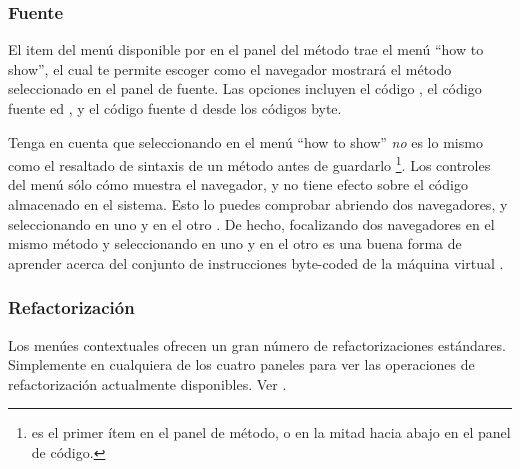 \documentclass[spanish,a4paper,10pt,twoside]{book}
\begin{document}

\subsubsection{Fuente}

El item del men\'u  disponible por  en el panel del m\'etodo trae el men\'u ``how to show'', el cual te permite escoger como el navegador mostrar\'a el m\'etodo seleccionado en el panel de fuente. Las opciones incluyen el c\'odigo , el c\'odigo fuente ed ,  y el c\'odigo fuente d desde los c\'odigos byte.

Tenga en cuenta que seleccionando  en el men\'u ``how to show'' \emph{no} es lo mismo como el resaltado de sintaxis de un m\'etodo antes de guardarlo \footnote{ es el primer \'item en el panel de m\'etodo, o en la mitad hacia abajo en el panel de c\'odigo.}.
Los controles del men\'u s\'olo c\'omo muestra el navegador, y no tiene efecto sobre el c\'odigo almacenado en el sistema.
Esto lo puedes comprobar abriendo dos navegadores, y seleccionando en uno  y en el otro .
De hecho, focalizando dos navegadores en el mismo m\'etodo y seleccionando en uno  y en el otro  es una buena forma de aprender acerca del conjunto de instrucciones byte-coded de la m\'aquina virtual \pharo.

\subsubsection{Refactorizaci\'on}

Los men\'ues contextuales ofrecen un gran n\'umero de refactorizaciones est\'andares.
Simplemente \actclick en cualquiera de los cuatro paneles para ver las operaciones de refactorizaci\'on actualmente disponibles.
Ver .
\end{document}
